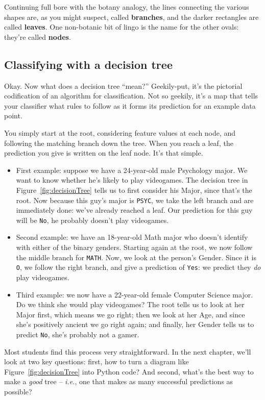 
Continuing full bore with the botany analogy, the lines connecting the various
shapes are, as you might suspect, called \textbf{branches}, and the darker
rectangles are called \textbf{leaves}. One non-botanic bit of lingo is the name
for the other ovals: they're called \textbf{nodes}.

\subsection{Classifying with a decision tree}

Okay. Now what does a decision tree ``mean?'' Geekily-put, it's the pictorial
codification of an algorithm for classification. Not so geekily, it's a map
that tells your classifier what rules to follow as it forms its prediction for
an example data point.

You simply start at the root, considering feature values at each node, and
following the matching branch down the tree. When you reach a leaf, the
prediction you give is written on the leaf node. It's that simple.

\begin{itemize}

\label{decisionTreeExamples}
\item First example: suppose we have a 24-year-old male
Psychology major. We want to know whether he's likely to play videogames. The
decision tree in Figure~\ref{fig:decisionTree} tells us to first consider his
\textsf{Major}, since that's the root. Now because this guy's major is
\texttt{PSYC}, we take the left branch and are immediately done: we've already
reached a leaf. Our prediction for this guy will be \texttt{No}, he probably
doesn't play videogames.

\item Second example: we have an 18-year-old Math major who
doesn't identify with either of the binary genders. Starting again at the root,
we now follow the middle branch for \texttt{MATH}. Now, we look at the person's
\textsf{Gender}. Since it is \texttt{O}, we follow the right branch, and give a
prediction of \texttt{Yes}: we predict they \textit{do} play videogames.

\item Third example: we now have a 22-year-old female Computer
Science major. Do we think she would play videogames? The root tells us to look
at her \textsf{Major} first, which means we go right; then we look at her
\textsf{Age}, and since she's positively ancient we go right again; and
finally, her \textsf{Gender} tells us to predict \texttt{No}, she's probably
not a gamer.

\end{itemize}

Most students find this process very straightforward. In the next chapter,
we'll look at two key questions: first, how to turn a diagram like
Figure~\ref{fig:decisionTree} into Python code? And second, what's the best way
to make a \textit{good} tree -- \textit{i.e.}, one that makes as many
successful predictions as possible? 

